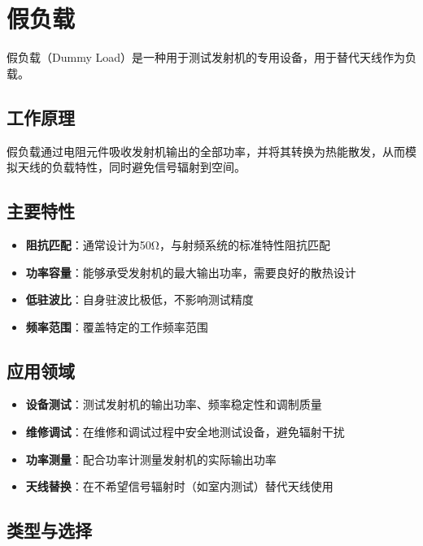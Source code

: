 
\chapter{假负载}
\label{chap:dummy_load}

假负载（Dummy Load）是一种用于测试发射机的专用设备，用于替代天线作为负载。

\section{工作原理}
\label{sec:dummy_load_principle}

假负载通过电阻元件吸收发射机输出的全部功率，并将其转换为热能散发，从而模拟天线的负载特性，同时避免信号辐射到空间。

\section{主要特性}
\label{sec:dummy_load_features}
\begin{itemize}
    \item \textbf{阻抗匹配}：通常设计为50Ω，与射频系统的标准特性阻抗匹配
    \item \textbf{功率容量}：能够承受发射机的最大输出功率，需要良好的散热设计
    \item \textbf{低驻波比}：自身驻波比极低，不影响测试精度
    \item \textbf{频率范围}：覆盖特定的工作频率范围
\end{itemize}

\section{应用领域}
\label{sec:dummy_load_applications}
\begin{itemize}
    \item \textbf{设备测试}：测试发射机的输出功率、频率稳定性和调制质量
    \item \textbf{维修调试}：在维修和调试过程中安全地测试设备，避免辐射干扰
    \item \textbf{功率测量}：配合功率计测量发射机的实际输出功率
    \item \textbf{天线替换}：在不希望信号辐射时（如室内测试）替代天线使用
\end{itemize}

\section{类型与选择}
\label{sec:dummy_load_types}

